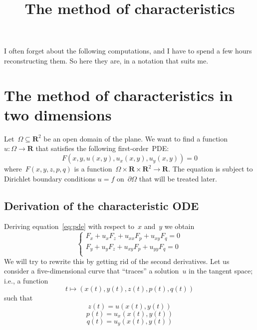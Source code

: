 
\newcommand{\ud}{\mathrm{d}}
\newcommand{\R}{\mathbf{R}}

\newcommand{\x}{\mathbf{x}}
\newcommand{\y}{\mathbf{y}}
\newcommand{\p}{\mathbf{p}}

\title{The method of characteristics}

I often forget about the following computations, and I have to spend a few hours
reconstructing them.
So here they are, in a notation that suits me.

\section{The method of characteristics in two dimensions}


Let~$\Omega\subseteq\R^2$ be an open domain of the plane.
We want to find a function~$u:\Omega\to\R$
that satisfies the following first-order~PDE:
\begin{equation}\label{eq:pde}
		F\left(x, y, u(x,y), u_x(x,y), u_y(x,y)\right)=0
\end{equation}
where~$F(x,y,z,p,q)$ is a function~$\Omega\times\R\times\R^2\to\R$.
The equation is subject to Dirichlet boundary conditions
$u=f$ on~$\partial\Omega$
that will be treated later.

\subsection{Derivation of the characteristic ODE}
Deriving equation~\eqref{eq:pde} with respect to~$x$ and~$y$ we obtain
\begin{equation}\label{eq:gradpde}
	\begin{cases}
		F_x + u_xF_z + u_{xx}F_p + u_{xy}F_q = 0\\
		F_y + u_yF_z + u_{xy}F_p + u_{yy}F_q = 0\\
	\end{cases}
\end{equation}
We will try to rewrite this by getting rid of the second derivatives.  Let us
consider a five-dimensional curve that ``traces'' a solution~$u$ in the
tangent space; i.e., a function
\begin{equation*}
	t\mapsto\left(
		x(t),y(t),z(t),p(t),q(t)
	\right)
\end{equation*}
such that
\begin{equation}
	z(t)=u\left(x(t),y(t)\right)
\end{equation}
\begin{equation}
	p(t)=u_x\left(x(t),y(t)\right)
\end{equation}
\begin{equation}
	q(t)=u_y\left(x(t),y(t)\right)
\end{equation}

